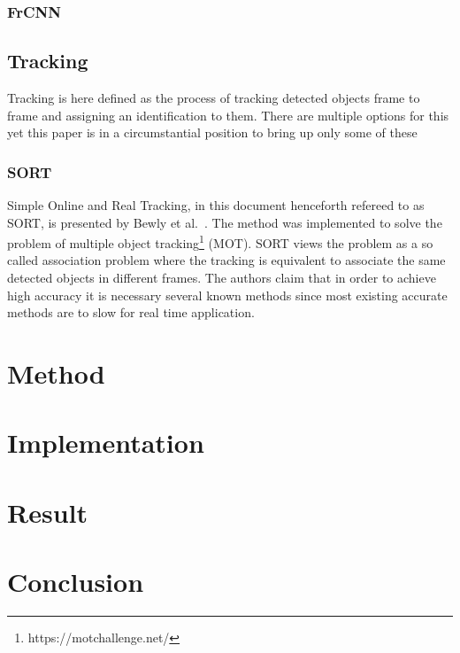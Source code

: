 \documentclass[twocolumn]{article}
\begin{document}
\subsubsection{FrCNN}
 
 
 
\subsection{Tracking}
 Tracking is here defined as the process of tracking detected objects frame to frame and assigning an identification to them. There are multiple options for this yet this paper is in a circumstantial position to bring up only some of these

\subsubsection{SORT}
 Simple Online and Real Tracking, in this document henceforth refereed to as SORT, is presented by Bewly et al.~\cite{Bewley2016_sort}. The method was implemented to solve the problem of multiple object tracking\footnote{https://motchallenge.net/} (MOT). SORT views the problem as a so called association problem where the tracking is equivalent to associate the same detected objects in different frames. The authors claim that in order to achieve high accuracy it is necessary several known methods since most existing accurate methods are to slow for real time application.   

\section{Method}

\section{Implementation}

\section{Result}

\section{Conclusion}

{}

\end{document}

